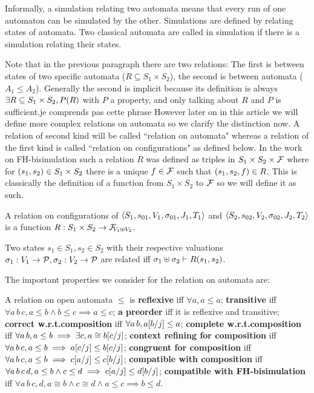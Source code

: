 \documentclass{article}
\begin{document}
Informally, a simulation relating two automata means that every run of one automaton can be simulated by the other.
Simulations are defined by relating states of automata.
Two classical automata are called in simulation if there is a simulation relating their states.

Note that in the previous paragraph there are two relations:
The first is between states of two specific automata (\(R \subseteq S_1 \times S_2\)), the second is between automata (\(A_1 \leq A_2\)).
\Ludo
{Generally the second is implicit because its definition is always \(\exists R \subseteq S_1 \times S_2, P\mpar{R}\) with \(P\) a property, and only talking about \(R\) and \(P\) is sufficient.}{je comprends pas cette phrase}
However later on in this article we will define more complex relations on automata so we clarify the distinction now.
A relation of second kind will be called ``relation on automata" whereas a relation of the first kind is called ``relation on configurations" as defined below.
In the work on FH-bisimulation \cite{henrio:01055091} such a relation \(R\) was defined as triples in \(S_1 \times S_2 \times \formulas\) where for \(\mpar{s_1, s_2} \in S_1 \times S_2\) there is a unique \(f \in \formulas\) such that \(\mpar{s_1, s_2, f} \in R\).
This is classically the definition of a function from \(S_1 \times S_2\) to \(\formulas\) so we will define it as such.
\begin{defi}
A relation on configurations of \(\OAg[1]\) and \(\OAg[2]\) is a function \(R: S_1 \times S_2 \to \rformulas[V_1 \uplus V_2]\).

Two states \(s_1 \in S_1, s_2 \in S_2\) with their respective valuations \(\sigma_1: V_1 \to \values, \sigma_2: V_2 \to \values\) are related iff \(\sigma_1 \uplus \sigma_2 \vdash R\mpar{s_1, s_2}\).
\end{defi}
The important properties we consider for the relation on automata are:
\begin{defi} A relation on open automata \(\leq\) is
 \textbf{reflexive} iff \(\forall a, a \leq a\);
 \textbf{transitive} iff \(\forall a\, b\, c, a \leq b \wedge b \leq c \implies a \leq c\);
 \textbf{a preorder} iff it is reflexive and transitive;
 \textbf{correct w.r.t.\@ composition} iff \(\forall a\, b, a\subst{b}{j} \leq a\);
 \textbf{complete w.r.t.\@ composition} iff \(\forall a\, b, a \leq b \implies \exists c, a \cong b\subst{c}{j}\);
 \textbf{context refining for composition} iff \(\forall a\, b\, c, a \leq b \implies a\subst{c}{j} \leq b\subst{c}{j}\);
 \textbf{congruent for composition} iff \(\forall a\, b\, c, a \leq b \implies c\subst{a}{j} \leq c\subst{b}{j}\);
 \textbf{compatible with composition} iff \(\forall a\, b\, c\, d, a \leq b \wedge c \leq d \implies c\subst{a}{j} \leq d\subst{b}{j}\);
 \textbf{compatible with FH-bisimulation} iff \(\forall a\, b\, c, d, a \cong b \wedge c \cong d \wedge a \leq c \implies b \leq d\).
\end{defi}
\end{document}
